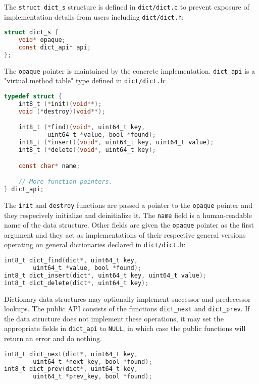 The \texttt{struct dict\_s} structure is defined in \texttt{dict/dict.c}
to prevent exposure of implementation details from users including
\texttt{dict/dict.h}:
\begin{lstlisting}[language=C]
struct dict_s {
	void* opaque;
	const dict_api* api;
};
\end{lstlisting}

The \texttt{opaque} pointer is maintained by the concrete implementation.
\texttt{dict\_api} is a "virtual method table" type defined in
\texttt{dict/dict.h}:

\begin{lstlisting}[language=C]
typedef struct {
	int8_t (*init)(void**);
	void (*destroy)(void**);

	int8_t (*find)(void*, uint64_t key,
			uint64_t *value, bool *found);
	int8_t (*insert)(void*, uint64_t key, uint64_t value);
	int8_t (*delete)(void*, uint64_t key);

	const char* name;

	// More function pointers.
} dict_api;
\end{lstlisting}

The \texttt{init} and \texttt{destroy} functions are passed a pointer to the
\texttt{opaque} pointer and they respecively initialize and deinitialize it.
The \texttt{name} field is a human-readable name of the data structure.
Other fields are given the \texttt{opaque} pointer as the first argument
and they act as implementations of their respective general versions operating
on general dictionaries declared in \texttt{dict/dict.h}:

\begin{lstlisting}[language=C]
int8_t dict_find(dict*, uint64_t key,
		uint64_t *value, bool *found);
int8_t dict_insert(dict*, uint64_t key, uint64_t value);
int8_t dict_delete(dict*, uint64_t key);
\end{lstlisting}

Dictionary data structures may optionally implement successor and predecessor
lookups. The public API consists of the functions \texttt{dict\_next} and
\texttt{dict\_prev}. If the data structure does not implement these operations,
it may set the appropriate fields in \texttt{dict\_api} to \texttt{NULL},
in which case the public functions will return an error and do nothing.
\begin{lstlisting}[language=C]
int8_t dict_next(dict*, uint64_t key,
		uint64_t *next_key, bool *found);
int8_t dict_prev(dict*, uint64_t key,
		uint64_t *prev_key, bool *found);
\end{lstlisting}

